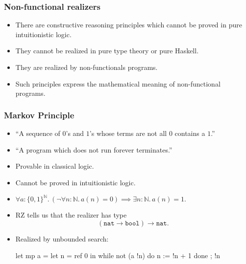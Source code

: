 \documentclass[t]{beamer}
\newcommand{\NN}{\mathbb{N}}
\begin{document}
\begin{frame}
  \frametitle{Non-functional realizers}

  \begin{itemize}
  \item There are constructive reasoning principles which cannot be
    proved in pure intuitionistic logic.
  \item They cannot be realized in pure type theory or pure Haskell.
  \item They are realized by non-functionals programs.
  \item Such principles express the mathematical meaning of
    non-functional programs.
  \end{itemize}

\end{frame}

\begin{frame}[fragile]
  \frametitle{Markov Principle}

  \begin{itemize}
  \item ``A sequence of $0$'s and $1$'s whose terms are not all $0$
    contains a $1$.''
  \item ``A program which does not run forever terminates.''
  \item Provable in classical logic.
  \item Cannot be proved in intuitionistic logic.
  \item $\forall a : \{0,1\}^\NN .\,
    (\lnot \forall n : \NN .\, a(n) = 0) \implies
    \exists n : \NN .\, a(n) = 1.$
  \item RZ tells us that the realizer has type
    \begin{equation*}
      (\mathtt{nat} \to \mathtt{bool}) \to \mathtt{nat}.
    \end{equation*}
  \item Realized by unbounded search:
    \begin{source}
let mp a =
  let n = ref 0 in
    while not (a !n) do n := !n + 1 done ;
    !n      
    \end{source}
  \end{itemize}
\end{frame}
\end{document}
